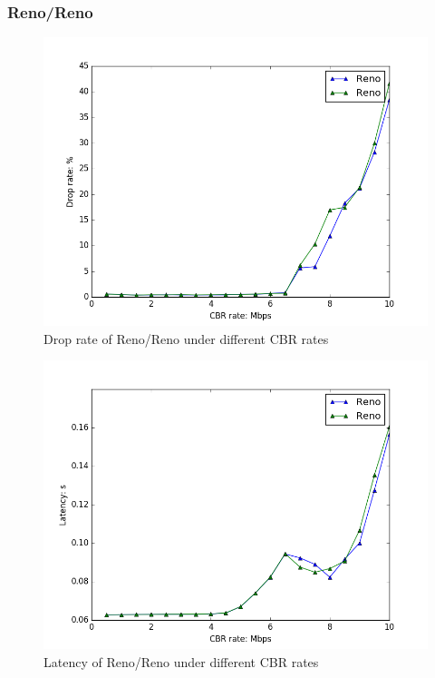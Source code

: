 \documentclass[10pt, conference]{IEEEtran/IEEEtran}
\begin{document}
\subsubsection{Reno/Reno}
\begin{figure}
\begin{center}
\includegraphics[width=\linewidth]{../exp2/exp2_Reno_Reno_drop.png}
\caption{Drop rate of Reno/Reno under different CBR rates}
\label{exp2_Reno_Reno_drop}
\end{center}
\end{figure}

\begin{figure}[htbp]
\begin{center}
\includegraphics[width=\linewidth]{../exp2/exp2_Reno_Reno_lat.png}
\caption{Latency of Reno/Reno under different CBR rates}
\label{exp2_Reno_Reno_lat}
\end{center}
\end{figure}
\end{document}
